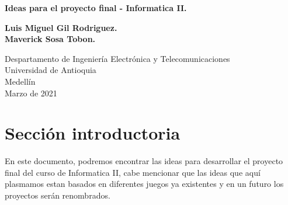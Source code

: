 \documentclass{article}
\begin{document}
\begin{titlepage}
    \begin{center}
        \vspace*{1cm}
            
        \Huge
        \textbf{Ideas para el proyecto final - Informatica II.}
            
        \vspace{0.5cm}
        \LARGE
            
        \vspace{1.5cm}
            
        \textbf{Luis Miguel Gil Rodriguez.}
        \\
        \textbf{Maverick Sosa Tobon.}
        \vfill
        \vspace{0.8cm}
            
        \Large
        Despartamento de Ingeniería Electrónica y Telecomunicaciones\\
        Universidad de Antioquia\\
        Medellín\\
        Marzo de 2021
            
    \end{center}
\end{titlepage}
\tableofcontents
\newpage
\section{Sección introductoria} \label{intro}
En este documento, podremos encontrar las ideas para desarrollar el proyecto final del curso de Informatica II, cabe mencionar que las ideas que aquí plasmamos estan basados en diferentes juegos ya existentes y en un futuro los proyectos serán renombrados.
\end{document}
